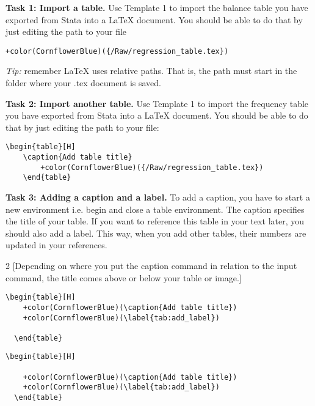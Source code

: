 \documentclass[12pts]{report}
\begin{document}
\textbf{Task 1: Import a table.} Use Template 1 to import the balance table you have exported from Stata into a {\LaTeX} document. You should be able to do that by just editing the path to your file
\begin{center}
\begin{Verbatim}[commandchars=+\(\)]
	+color(CornflowerBlue)({/Raw/regression_table.tex})
\end{Verbatim}
\end{center}

\begin{center}
	\textcolor{BurntOrange}{\emph{Tip:} remember {\LaTeX} uses relative paths. That is, the path must start in the folder where your .tex document is saved.}
\end{center}
		
\textbf{Task 2: Import another table.} Use Template 1 to import the frequency table you have exported from Stata into a {\LaTeX} document. You should be able to do that by just editing the path to your file:
\begin{center}
	\begin{Verbatim}[commandchars=+\(\)]
	\begin{table}[H]
	\caption{Add table title}
		+color(CornflowerBlue)({/Raw/regression_table.tex})
	\end{table}
	\end{Verbatim}
\end{center}

\textbf{Task 3: Adding a caption and a label.} To add a caption, you have to start a new environment i.e. begin and close a table environment. The caption specifies the title of your table. If you want to reference this table in your text later, you should also add a label. This way, when you add other tables, their numbers are updated in your references. \\

\begin{multicols}{2}
	[Depending on where you put the caption command in relation to the input command, the title comes above or below your table or image.]
	\begin{Verbatim}[commandchars=+\(\)]
  \begin{table}[H]
  	+color(CornflowerBlue)(\caption{Add table title})
  	+color(CornflowerBlue)(\label{tab:add_label})
  	
  \end{table}
	\end{Verbatim}

	\begin{Verbatim}[commandchars=+\(\)]
  \begin{table}[H]
  	
  	+color(CornflowerBlue)(\caption{Add table title})
  	+color(CornflowerBlue)(\label{tab:add_label})
  \end{table}
	\end{Verbatim}
\end{multicols}
\end{document}
